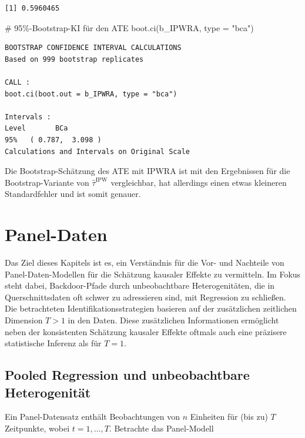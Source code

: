 \documentclass[
  a4paper,
  DIV=11,
  oneside]{scrreprt}
\newenvironment{Shaded}{\begin{snugshade}}{\end{snugshade}}
\newcommand{\AttributeTok}[1]{\textcolor[rgb]{0.40,0.45,0.13}{#1}}
\newcommand{\CommentTok}[1]{\textcolor[rgb]{0.37,0.37,0.37}{#1}}
\newcommand{\FunctionTok}[1]{\textcolor[rgb]{0.28,0.35,0.67}{#1}}
\newcommand{\NormalTok}[1]{\textcolor[rgb]{0.00,0.23,0.31}{#1}}
\newcommand{\StringTok}[1]{\textcolor[rgb]{0.13,0.47,0.30}{#1}}
\begin{document}
\begin{verbatim}
[1] 0.5960465
\end{verbatim}

\begin{Shaded}
\begin{Highlighting}[]
\CommentTok{\# 95\%{-}Bootstrap{-}KI für den ATE}
\FunctionTok{boot.ci}\NormalTok{(b\_IPWRA, }\AttributeTok{type =} \StringTok{"bca"}\NormalTok{)}
\end{Highlighting}
\end{Shaded}

\begin{verbatim}
BOOTSTRAP CONFIDENCE INTERVAL CALCULATIONS
Based on 999 bootstrap replicates

CALL : 
boot.ci(boot.out = b_IPWRA, type = "bca")

Intervals : 
Level       BCa          
95%   ( 0.787,  3.098 )  
Calculations and Intervals on Original Scale
\end{verbatim}

Die Bootstrap-Schätzung des ATE mit IPWRA ist mit den Ergebnissen für
die Bootstrap-Variante von \(\widehat{\tau}^\text{IPW}\) vergleichbar,
hat allerdings einen etwas kleineren Standardfehler und ist somit
genauer.


\chapter{Panel-Daten}\label{sec-paneldata}

Das Ziel dieses Kapitels ist es, ein Verständnis für die Vor- und
Nachteile von Panel-Daten-Modellen für die Schätzung kausaler Effekte zu
vermitteln. Im Fokus steht dabei, Backdoor-Pfade durch unbeobachtbare
Heterogenitäten, die in Querschnittsdaten oft schwer zu adressieren
sind, mit Regression zu schließen. Die betrachteten
Identifikationsstrategien basieren auf der zusätzlichen zeitlichen
Dimension \(T>1\) in den Daten. Diese zusätzlichen Informationen
ermöglicht neben der konsistenten Schätzung kausaler Effekte oftmals
auch eine präzisere statistische Inferenz als für \(T=1\).

\section{Pooled Regression und unbeobachtbare
Heterogenität}\label{sec-panel-uh}

Ein Panel-Datensatz enthält Beobachtungen von \(n\) Einheiten für (bis
zu) \(T\) Zeitpunkte, wobei \(t=1,\dots,T\). Betrachte das Panel-Modell
\end{document}
